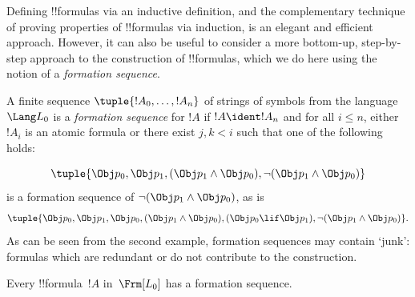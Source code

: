 \documentclass[../../../include/open-logic-section]{subfiles}
\begin{document}


Defining !!{formula}s via an inductive definition, and the
complementary technique of proving properties of !!{formula}s via
induction, is an elegant and efficient approach. However, it can
also be useful to consider a more bottom-up, step-by-step approach
to the construction of !!{formula}s, which we do here using the
notion of a \emph{formation sequence}.

\begin{defn}
A finite sequence $\tuple{!A_0,\dotsc,!A_n}$ of strings of
symbols from the language~$\Lang L_0$ is a \emph{formation
sequence} for $!A$ if $!A \ident !A_n$ and for all $i \leq n$,
either $!A_i$ is an atomic formula or there exist $j,k < i$
such that one of the following holds:
\begin{enumerate}
\end{enumerate}
\end{defn}

\begin{ex}
\[
\tuple{
    \Obj p_0,
    \Obj p_1,
    (\Obj p_1 \land \Obj p_0),
    \lnot (\Obj p_1 \land \Obj p_0)
}
\]
is a formation sequence of
$\lnot (\Obj p_1 \land \Obj p_0)$, as is
\[
\tuple{
    \Obj p_0,
    \Obj p_1,
    \Obj p_0,
    (\Obj p_1 \land \Obj p_0),
    (\Obj p_0 \lif \Obj p_1),
    \lnot (\Obj p_1 \land \Obj p_0)
}.
\]
%
As can be seen from the second example, formation sequences
may contain `junk': formulas which are redundant or do not
contribute to the construction.
\end{ex}

\begin{prop}
Every !!{formula}~$!A$ in~$\Frm[L_0]$ has a formation sequence.
\end{prop}
\end{document}
